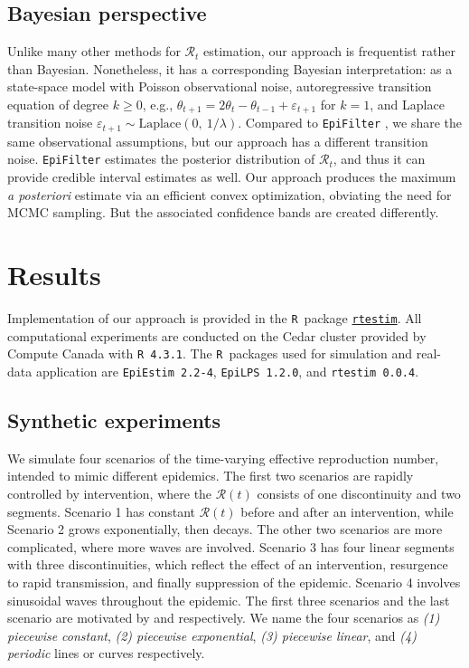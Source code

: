 \documentclass[10pt,letterpaper]{article}
\newcommand{\R}{\texttt{R}}
\def\calR{\mathcal{R}}
\newcommand{\citep}[1]{\cite{#1}}
\begin{document}
\subsection{Bayesian perspective}

Unlike many other methods for $\calR_t$ estimation, our approach is frequentist
rather than Bayesian. Nonetheless, it has a corresponding Bayesian
interpretation: as a state-space model with Poisson observational noise,
autoregressive transition equation of degree $k\geq 0$, e.g., $\theta_{t+1} =
2\theta_t - \theta_{t-1} + \varepsilon_{t+1}$ for $k=1$, and Laplace transition
noise $\varepsilon_{t+1}\sim \mathrm{Laplace}(0,\ 1/\lambda)$. Compared to
\texttt{EpiFilter} \citep{parag2021improved},
 we share the same observational assumptions, but our approach has a
different transition noise. \texttt{EpiFilter} estimates the posterior
distribution of
$\calR_t$, and thus it can provide credible interval estimates as well. Our
approach produces the maximum \emph{a posteriori} estimate via an efficient
convex optimization, obviating the need for MCMC sampling. But the associated
confidence bands are created differently.


\section{Results}

Implementation of our approach is provided in the \R\ package
\href{https://dajmcdon.github.io/rtestim/}{\texttt{rtestim}}. 
All computational experiments are conducted on the Cedar cluster provided 
by Compute Canada with \texttt{R 4.3.1}. The \R\ packages used for
simulation and real-data application are \texttt{EpiEstim 2.2-4},
\texttt{EpiLPS 1.2.0}, and \texttt{rtestim 0.0.4}. 

\subsection{Synthetic experiments}

We simulate four scenarios of the time-varying effective reproduction number,
intended to mimic different epidemics. The first two scenarios are rapidly 
controlled by intervention, where the $\calR(t)$ consists
of one discontinuity and two segments. Scenario 1 has constant $\calR(t)$ before
and after an intervention, while Scenario 2 grows exponentially, then decays.
The other two scenarios are more complicated, where more waves
are involved. Scenario 3 has four linear segments with three discontinuities,
which reflect the effect of an intervention, resurgence to rapid transmission,
and finally suppression of the epidemic. Scenario 4 involves sinusoidal waves
throughout the epidemic.
The first three scenarios and the last scenario are motivated by
\cite{parag2021improved} and \cite{gressani2022epilps} respectively. 
We name the four scenarios as \textit{(1) piecewise constant}, \textit{(2) 
piecewise exponential}, \textit{(3) piecewise linear}, and \textit{(4) periodic} 
lines or curves respectively. 
\end{document}
